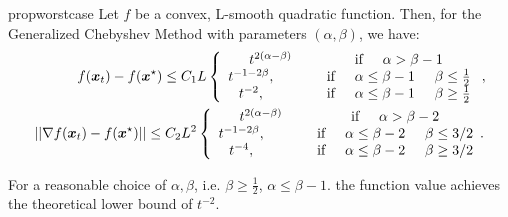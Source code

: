 \documentclass{article}
\begin{document}
\begin{restatable}{prop}{worstcase}
Let $f$ be a convex, L-smooth quadratic function. Then, for the Generalized Chebyshev Method with parameters $(\alpha,\beta)$, we have:
\begin{align}
 f({\boldsymbol x}_t)-f({\boldsymbol x}^\star) \leq C_1L\left\{
    \begin{array}{cc}
           t^{2(\alpha-\beta)} &\text{if} \hspace{0.5 cm} \alpha>\beta-1 \\
         t^{-1-2\beta}, \hspace{1 cm} &\text{if} \hspace{0.5 cm} \alpha\leq \beta-1\hspace{0.5 cm} \beta\leq \frac{1}{2}\\
         t^{-2}, \hspace{1 cm} &\text{if} \hspace{0.5 cm} \alpha\leq\beta-1\hspace{0.5 cm} \beta\geq \frac{1}{2} 
    \end{array}
    \right . ,\\
    ||\nabla f({\boldsymbol x}_t)-f({\boldsymbol x}^\star)||\leq C_2L^2\left\{
    \begin{array}{cc}
           t^{2(\alpha-\beta)} &\text{if} \hspace{0.5 cm} \alpha>\beta-2 \\
         t^{-1-2\beta}, \hspace{1 cm} &\text{if} \hspace{0.5 cm} \alpha\leq \beta-2\hspace{0.5 cm} \beta\leq 3/2\\
         t^{-4}, \hspace{1 cm} &\text{if} \hspace{0.5 cm} \alpha\leq\beta-2\hspace{0.5 cm} \beta\geq 3/2
    \end{array}.
    \right. 
\end{align}
\end{restatable}


For  a reasonable choice of $\alpha,\beta$, i.e. $\beta\geq \frac{1}{2}$, $\alpha\leq \beta-1$. the function value achieves the theoretical lower bound of $t^{-2}$.
\end{document}
